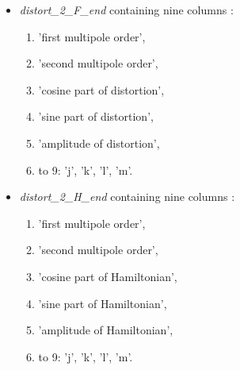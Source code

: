 \begin{itemize}
   \item \textit{distort\_2\_F\_end} containing nine columns : 
     \begin{enumerate}
        \item 'first multipole order',
        \item 'second multipole order',  
        \item 'cosine part of distortion', 
        \item 'sine part of distortion', 
        \item 'amplitude of distortion', 
        \item to 9: 'j', 'k', 'l', 'm'. 
     \end{enumerate}
   \item \textit{distort\_2\_H\_end}  containing nine columns :  
     \begin{enumerate}
        \item 'first multipole order', 
        \item 'second multipole order', 
        \item 'cosine part of Hamiltonian', 
        \item 'sine part of Hamiltonian', 
        \item 'amplitude of Hamiltonian', 
        \item to 9: 'j', 'k', 'l', 'm'.  
     \end{enumerate}
\end{itemize}



